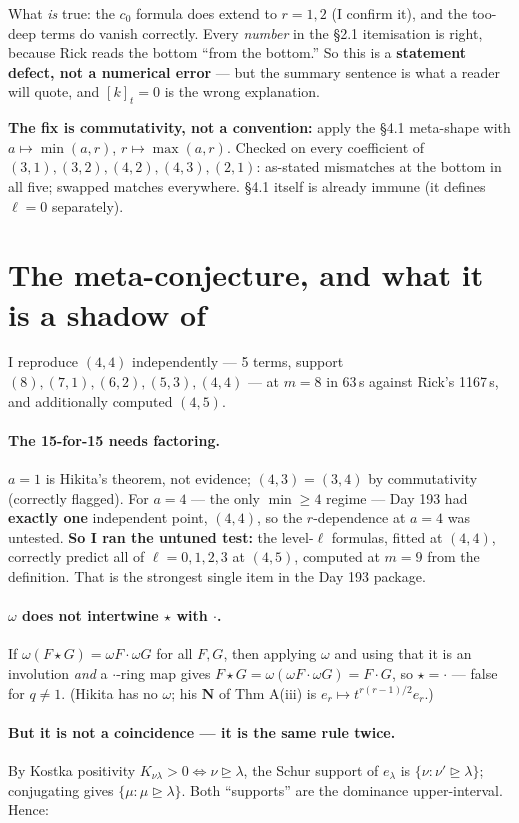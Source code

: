 \documentclass[11pt,a4paper]{article}
\newcommand{\dom}{\trianglerighteq}
\begin{document}
What \emph{is} true: the $c_0$ formula does extend to $r=1,2$ (I confirm it), and the
too-deep terms do vanish correctly. Every \emph{number} in the \S2.1 itemisation is
right, because Rick reads the bottom ``from the bottom.'' So this is a
\textbf{statement defect, not a numerical error} --- but the summary sentence is what
a reader will quote, and $[k]_t=0$ is the wrong explanation.

\noindent\textbf{The fix is commutativity, not a convention:} apply the \S4.1
meta-shape with $a\mapsto\min(a,r)$, $r\mapsto\max(a,r)$. Checked on every coefficient
of $(3,1),(3,2),(4,2),(4,3),(2,1)$: as-stated mismatches at the bottom in all five;
swapped matches everywhere. \S4.1 itself is already immune (it defines $\ell=0$
separately).

\section{The meta-conjecture, and what it is a shadow of}
I reproduce $(4,4)$ independently --- 5 terms, support $(8),(7,1),(6,2),(5,3),(4,4)$
--- at $m=8$ in 63\,s against Rick's 1167\,s, and additionally computed $(4,5)$.

\paragraph{The 15-for-15 needs factoring.} $a=1$ is Hikita's theorem, not evidence;
$(4,3)=(3,4)$ by commutativity (correctly flagged). For $a=4$ --- the only
$\min\ge4$ regime --- Day 193 had \textbf{exactly one} independent point, $(4,4)$, so
the $r$-dependence at $a=4$ was untested. \textbf{So I ran the untuned test:} the
level-$\ell$ formulas, fitted at $(4,4)$, correctly predict all of
$\ell=0,1,2,3$ at $(4,5)$, computed at $m=9$ from the definition. That is the
strongest single item in the Day 193 package.

\paragraph{$\omega$ does not intertwine $\star$ with $\cdot$.} If
$\omega(F\star G)=\omega F\cdot\omega G$ for all $F,G$, then applying $\omega$ and
using that it is an involution \emph{and} a $\cdot$-ring map gives
$F\star G=\omega(\omega F\cdot\omega G)=F\cdot G$, so $\star=\cdot$ --- false for
$q\ne1$. (Hikita has no $\omega$; his $\mathbf N$ of Thm A(iii) is
$e_r\mapsto t^{r(r-1)/2}e_r$.)

\paragraph{But it is not a coincidence --- it is the same rule twice.} By Kostka
positivity $K_{\nu\lambda}>0\iff\nu\dom\lambda$, the Schur support of $e_\lambda$ is
$\{\nu:\nu'\dom\lambda\}$; conjugating gives $\{\mu:\mu\dom\lambda\}$. Both
``supports'' are the dominance upper-interval. Hence:
\end{document}
